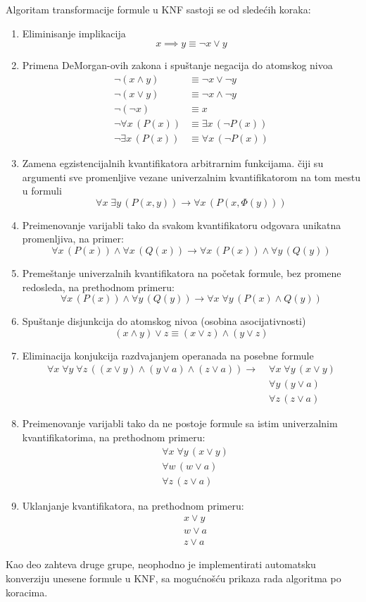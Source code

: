Algoritam transformacije formule u KNF sastoji se od sledećih koraka:
\begin{enumerate}
\item Eliminisanje implikacija
$$ x \implies y \equiv \neg x \lor y $$
\item Primena DeMorgan-ovih zakona i spuštanje negacija do atomskog nivoa
\begin{align*}
\neg(x \land y) &\equiv \neg x \lor \neg y \\
\neg(x \lor y) &\equiv \neg x \land \neg y \\
\neg (\neg x) &\equiv x \\
\neg \forall x \, (P(x)) &\equiv \exists x \, (\neg P(x)) \\
\neg \exists x \, (P(x)) &\equiv \forall x \, (\neg P(x))
\end{align*}
\item Zamena egzistencijalnih kvantifikatora arbitrarnim funkcijama. čiji su argumenti sve promenljive vezane univerzalnim kvantifikatorom na tom mestu u formuli
$$ \forall x \; \exists y \, (P(x, y)) \to \forall x \, (P(x, \Phi(y))) $$
\item Preimenovanje varijabli tako da svakom kvantifikatoru odgovara unikatna promenljiva, na primer:
$$ \forall x \, (P(x)) \land \forall x \, (Q(x)) \to
\forall x \, (P(x)) \land \forall y \, (Q(y)) $$
\item Premeštanje univerzalnih kvantifikatora na početak formule, bez promene redosleda, na prethodnom primeru:
$$ \forall x\, (P(x)) \land \forall y \, (Q(y)) \to
\forall x \; \forall y \, (P(x) \land Q(y)) $$
\item Spuštanje disjunkcija do atomskog nivoa (osobina asocijativnosti)
$$ (x \land y) \lor z \equiv (x \lor z) \land (y \lor z) $$
\item Eliminacija konjukcija razdvajanjem operanada na posebne formule
\begin{align*}
\forall x \; \forall y \; \forall z \, ((x \lor y) \land (y \lor a) \land (z \lor a)) \to \; &\forall x \; \forall y \, (x \lor y) \\
&\forall y \, (y \lor a) \\
&\forall z \, (z \lor a)
\end{align*}
\item Preimenovanje varijabli tako da ne postoje formule sa istim univerzalnim kvantifikatorima, na prethodnom primeru:
\begin{align*}
&\forall x \; \forall y \, (x \lor y) \\
&\forall w \, (w \lor a) \\
&\forall z \, (z \lor a)
\end{align*}
\item Uklanjanje kvantifikatora, na prethodnom primeru:
\begin{align*}
& x \lor y \\
& w \lor a \\
& z \lor a
\end{align*}
\end{enumerate}
Kao deo zahteva druge grupe, neophodno je implementirati automatsku konverziju unesene formule u KNF, sa mogućnošću prikaza rada algoritma po koracima.

